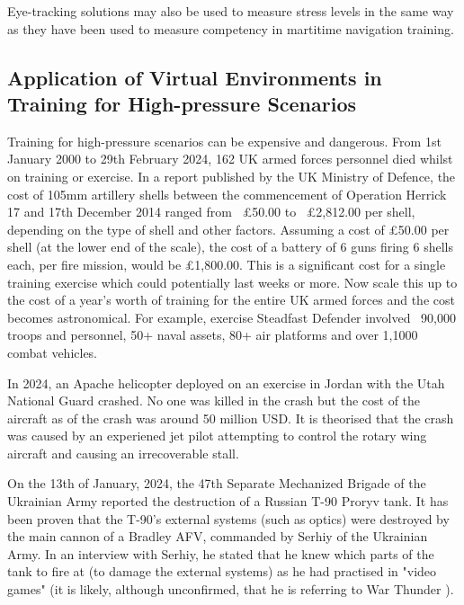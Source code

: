 \documentclass[12pt]{article}
\begin{document}
Eye-tracking solutions may also be used to measure stress levels in the same way as they have been used to measure competency in martitime navigation training. \cite{atik2019use}

\subsection{Application of Virtual Environments in Training for High-pressure Scenarios}

Training for high-pressure scenarios can be expensive and dangerous. From 1st January 2000 to 29th February 2024, 162 UK armed forces personnel died whilst on training or exercise. \cite{ukmod2024} In a report published by the UK Ministry of Defence, the cost of 105mm artillery shells between the commencement of Operation Herrick 17 and 17th December 2014 ranged from ~£50.00 to ~£2,812.00 per shell, depending on the type of shell and other factors. \cite{ukmod2015} Assuming a cost of £50.00 per shell (at the lower end of the scale), the cost of a battery of 6 guns firing 6 shells each, per fire mission, would be £1,800.00. This is a significant cost for a single training exercise which could potentially last weeks or more. Now scale this up to the cost of a year's worth of training for the entire UK armed forces and the cost becomes astronomical. For example, exercise Steadfast Defender involved ~90,000 troops and personnel, 50+ naval assets, 80+ air platforms and over 1,1000 combat vehicles. \cite{steadfastdefender24}

In 2024, an Apache helicopter deployed on an exercise in Jordan with the Utah National Guard crashed. \cite{intergalactic2024} No one was killed in the crash but the cost of the aircraft as of the crash was around 50 million USD. \cite{cbsaustin2024} It is theorised that the crash was caused by an experiened jet pilot attempting to control the rotary wing aircraft and causing an irrecoverable stall. \cite{carlisle2024}

On the 13th of January, 2024, the 47th Separate Mechanized Brigade of the Ukrainian Army reported the destruction of a Russian T-90 Proryv tank. \cite{malyasov2024} It has been proven that the T-90's external systems (such as optics) were destroyed by the main cannon of a Bradley AFV, commanded by Serhiy of the Ukrainian Army. In an interview with Serhiy, he stated that he knew which parts of the tank to fire at (to damage the external systems) as he had practised in "video games" \cite{militaryconflict2025} (it is likely, although unconfirmed, that he is referring to War Thunder \cite{warthunder}).
\end{document}
